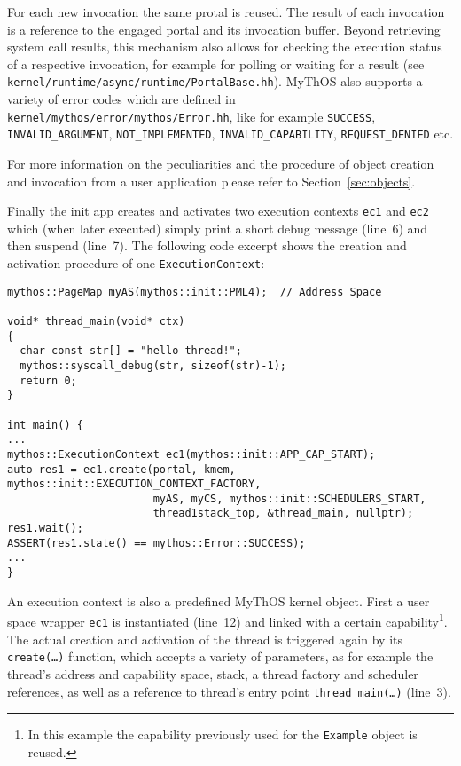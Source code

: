 \noindent For each new invocation the same protal is reused. The result of each
invocation is a reference to the engaged portal and its invocation buffer.
Beyond retrieving system call results, this mechanism also allows for checking
the execution status of a respective invocation, for example for polling or
waiting for a result (see \texttt{kernel/runtime/async/runtime/PortalBase.hh}).
MyThOS also supports a variety of error codes which are defined in
\texttt{kernel/mythos/error/mythos/Error.hh}, like for example \texttt{SUCCESS},
\texttt{INVALID\_ARGUMENT}, \texttt{NOT\_IMPLEMENTED},
\texttt{INVALID\_CAPABILITY}, \texttt{REQUEST\_DENIED} etc.

For more information on the peculiarities
and the procedure of object creation and invocation from a user application
please refer to Section~\ref{sec:objects}.
 
Finally the init app creates and activates two execution contexts \texttt{ec1}
and \texttt{ec2} which (when later executed) simply print a short debug message
(line~6) and then suspend (line~7). The following code excerpt shows the
creation and activation procedure of one \texttt{ExecutionContext}:
 
\lstset{language=c++}
\begin{lstlisting}
mythos::PageMap myAS(mythos::init::PML4);  // Address Space

void* thread_main(void* ctx)
{
  char const str[] = "hello thread!";
  mythos::syscall_debug(str, sizeof(str)-1);
  return 0;
}

int main() {
...
mythos::ExecutionContext ec1(mythos::init::APP_CAP_START);
auto res1 = ec1.create(portal, kmem, mythos::init::EXECUTION_CONTEXT_FACTORY,
                       myAS, myCS, mythos::init::SCHEDULERS_START,
                       thread1stack_top, &thread_main, nullptr);
res1.wait();
ASSERT(res1.state() == mythos::Error::SUCCESS);
...
}
\end{lstlisting}

An execution context is also a predefined MyThOS kernel object.
First a user space wrapper \texttt{ec1} is instantiated (line~12) and linked
with a certain capability\footnote{In this example the capability previously
used for the \texttt{Example} object is reused.}.
The actual creation and activation of the thread is triggered again by its
\texttt{create(\ldots)} function, which accepts a variety of parameters, as for
example the thread's address and capability space, stack, a thread factory and
scheduler references, as well as a reference to thread's entry point
\texttt{thread\_main(\ldots)} (line~3).

